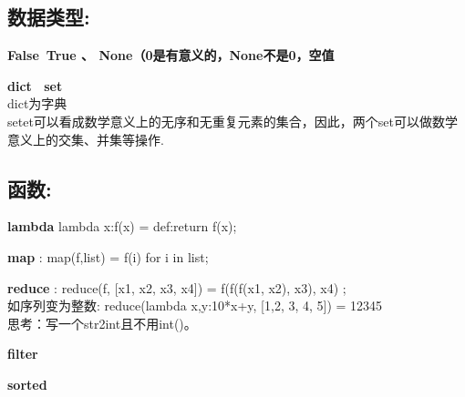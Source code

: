 \documentclass{article}
\begin{document}
\subsection*{数据类型:}
	

	\textbf{False\ True 、 None（0是有意义的，None不是0，空值}

	\textbf{dict \ set}\\
	dict为字典\\
	setet可以看成数学意义上的无序和无重复元素的集合，因此，两个set可以做数学意义上的交集、并集等操作.


\subsection*{函数:}

	\textbf{lambda} lambda x:f(x)  = def:return f(x);

	\textbf{map} :  map(f,list) = f(i) for i in list; 

	\textbf{reduce} : reduce(f, [x1, x2, x3, x4]) = f(f(f(x1, x2), x3), x4) ;\\
	如序列变为整数: reduce(lambda x,y:10*x+y, [1,2, 3, 4, 5]) = 12345\\
	思考：写一个str2int且不用int()。

	\textbf{filter} 

	\textbf{sorted}
\end{document}
